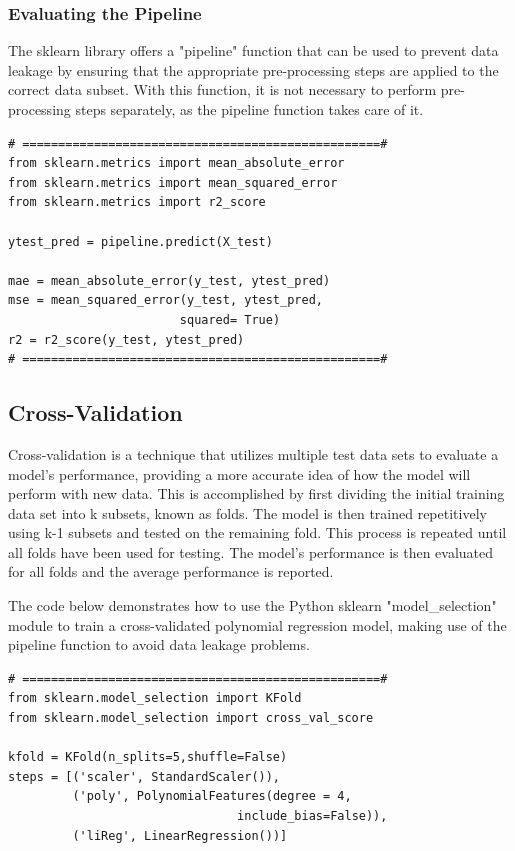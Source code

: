 {\subsubsection{\textbf{Evaluating the Pipeline}}

The sklearn library offers a "pipeline" function that can be used to prevent data leakage by ensuring that the appropriate pre-processing steps are applied to the correct data subset. With this function, it is not necessary to perform pre-processing steps separately, as the pipeline function takes care of it.

\begin{lstlisting}
# ==================================================#
from sklearn.metrics import mean_absolute_error
from sklearn.metrics import mean_squared_error
from sklearn.metrics import r2_score

ytest_pred = pipeline.predict(X_test)

mae = mean_absolute_error(y_test, ytest_pred)
mse = mean_squared_error(y_test, ytest_pred,
                        squared= True)
r2 = r2_score(y_test, ytest_pred)
# ==================================================#
\end{lstlisting}

\newpage
\subsection{Cross-Validation} \label{sec:cv}
Cross-validation is a technique that utilizes multiple test data sets to evaluate a model's performance, providing a more accurate idea of how the model will perform with new data. This is accomplished by first dividing the initial training data set into k subsets, known as folds. The model is then trained repetitively using k-1 subsets and tested on the remaining fold. This process is repeated until all folds have been used for testing. The model's performance is then evaluated for all folds and the average performance is reported.

The code below demonstrates how to use the Python sklearn "model\_selection" module to train a cross-validated polynomial regression model, making use of the pipeline function to avoid data leakage problems.

\begin{lstlisting}
# ==================================================#
from sklearn.model_selection import KFold
from sklearn.model_selection import cross_val_score

kfold = KFold(n_splits=5,shuffle=False)
steps = [('scaler', StandardScaler()),
         ('poly', PolynomialFeatures(degree = 4,
                                include_bias=False)),
         ('liReg', LinearRegression())]


\end{lstlisting}}
